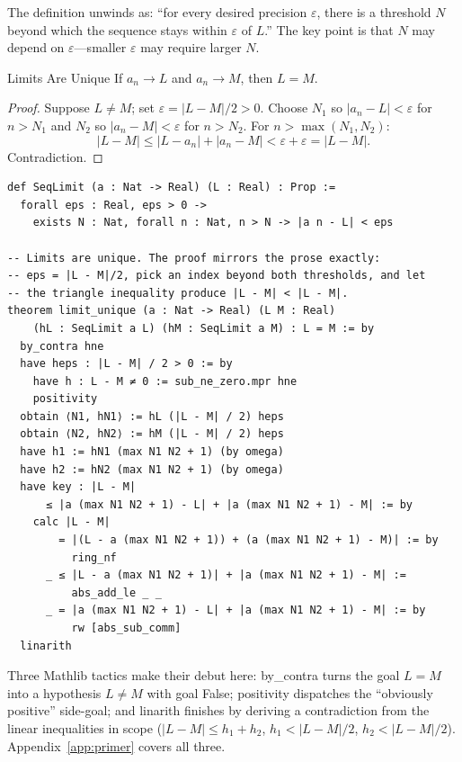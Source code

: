 \documentclass[12pt, openany]{book}
\theoremstyle{plain}
\theoremstyle{definition}
\theoremstyle{remark}
\newcommand{\eps}{\varepsilon}
\newcommand{\li}[1]{{\ttfamily\small\color{tealaccent}#1}}
\begin{document}
The definition unwinds as: ``for every desired precision $\eps$, there is a threshold $N$ beyond which the sequence stays within $\eps$ of $L$.'' The key point is that $N$ may depend on $\eps$---smaller $\eps$ may require larger $N$.

\begin{thmbox}{Limits Are Unique}
If $a_n \to L$ and $a_n \to M$, then $L = M$.
\end{thmbox}
\color{black}

\begin{proof}
Suppose $L \neq M$; set $\eps = |L - M|/2 > 0$. Choose $N_1$ so $|a_n - L| < \eps$ for $n > N_1$ and $N_2$ so $|a_n - M| < \eps$ for $n > N_2$. For $n > \max(N_1, N_2)$:
\[ |L - M| \leq |L - a_n| + |a_n - M| < \eps + \eps = |L - M|. \]
Contradiction.
\end{proof}

\begin{leanbox}
\begin{lstlisting}
def SeqLimit (a : Nat -> Real) (L : Real) : Prop :=
  forall eps : Real, eps > 0 ->
    exists N : Nat, forall n : Nat, n > N -> |a n - L| < eps

-- Limits are unique. The proof mirrors the prose exactly:
-- eps = |L - M|/2, pick an index beyond both thresholds, and let
-- the triangle inequality produce |L - M| < |L - M|.
theorem limit_unique (a : Nat -> Real) (L M : Real)
    (hL : SeqLimit a L) (hM : SeqLimit a M) : L = M := by
  by_contra hne
  have heps : |L - M| / 2 > 0 := by
    have h : L - M ≠ 0 := sub_ne_zero.mpr hne
    positivity
  obtain ⟨N1, hN1⟩ := hL (|L - M| / 2) heps
  obtain ⟨N2, hN2⟩ := hM (|L - M| / 2) heps
  have h1 := hN1 (max N1 N2 + 1) (by omega)
  have h2 := hN2 (max N1 N2 + 1) (by omega)
  have key : |L - M|
      ≤ |a (max N1 N2 + 1) - L| + |a (max N1 N2 + 1) - M| := by
    calc |L - M|
        = |(L - a (max N1 N2 + 1)) + (a (max N1 N2 + 1) - M)| := by
          ring_nf
      _ ≤ |L - a (max N1 N2 + 1)| + |a (max N1 N2 + 1) - M| :=
          abs_add_le _ _
      _ = |a (max N1 N2 + 1) - L| + |a (max N1 N2 + 1) - M| := by
          rw [abs_sub_comm]
  linarith
\end{lstlisting}
\end{leanbox}
\color{black}

Three Mathlib tactics make their debut here: \li{by\_contra} turns the goal $L = M$ into a hypothesis $L \neq M$ with goal \li{False}; \li{positivity} dispatches the ``obviously positive'' side-goal; and \li{linarith} finishes by deriving a contradiction from the linear inequalities in scope ($|L-M| \leq h_1 + h_2$, $h_1 < |L-M|/2$, $h_2 < |L-M|/2$).  Appendix~\ref{app:primer} covers all three.
\end{document}
